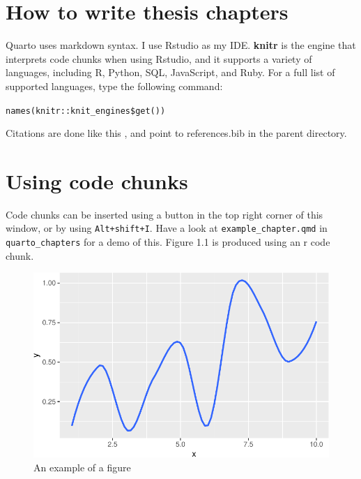 \documentclass[../main.tex]{subfiles}
\begin{document}
\ifdefined\Shaded\renewenvironment{Shaded}{\begin{tcolorbox}[enhanced, sharp corners, frame hidden, boxrule=0pt, interior hidden, borderline west={3pt}{0pt}{shadecolor}, breakable]}{\end{tcolorbox}}\fi

\hypertarget{how-to-write-thesis-chapters}{%
\section{How to write thesis
chapters}\label{how-to-write-thesis-chapters}}

Quarto uses markdown syntax. I use Rstudio as my IDE. \textbf{knitr} is
the engine that interprets code chunks when using Rstudio, and it
supports a variety of languages, including R, Python, SQL, JavaScript,
and Ruby. For a full list of supported languages, type the following
command:

\texttt{names(knitr::knit\_engines\$get())}

Citations are done like this \cite{strain_2023}, and point to
references.bib in the parent directory.

\hypertarget{using-code-chunks}{%
\section{Using code chunks}\label{using-code-chunks}}

Code chunks can be inserted using a button in the top right corner of
this window, or by using \texttt{Alt+shift+I}. Have a look at
\texttt{example\_chapter.qmd} in \texttt{quarto\_chapters} for a demo of
this. Figure 1.1 is produced using an r code chunk.

\begin{figure}

{\centering \includegraphics{example_chapter_files/figure-latex/my-code-chunk-1.pdf}

}

\caption{An example of a figure}

\end{figure}
\end{document}
